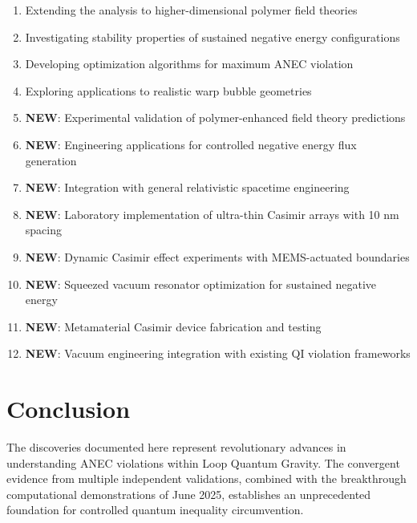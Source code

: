 \documentclass[11pt]{article}
\begin{document}
\begin{enumerate}
    \item Extending the analysis to higher-dimensional polymer field theories
    \item Investigating stability properties of sustained negative energy configurations
    \item Developing optimization algorithms for maximum ANEC violation
    \item Exploring applications to realistic warp bubble geometries
    \item \textbf{NEW}: Experimental validation of polymer-enhanced field theory predictions
    \item \textbf{NEW}: Engineering applications for controlled negative energy flux generation
    \item \textbf{NEW}: Integration with general relativistic spacetime engineering
    \item \textbf{NEW}: Laboratory implementation of ultra-thin Casimir arrays with 10 nm spacing
    \item \textbf{NEW}: Dynamic Casimir effect experiments with MEMS-actuated boundaries
    \item \textbf{NEW}: Squeezed vacuum resonator optimization for sustained negative energy
    \item \textbf{NEW}: Metamaterial Casimir device fabrication and testing
    \item \textbf{NEW}: Vacuum engineering integration with existing QI violation frameworks
\end{enumerate}

\section{Conclusion}

The discoveries documented here represent revolutionary advances in understanding ANEC violations within Loop Quantum Gravity. The convergent evidence from multiple independent validations, combined with the breakthrough computational demonstrations of June 2025, establishes an unprecedented foundation for controlled quantum inequality circumvention.
\end{document}
